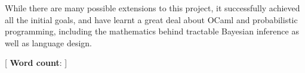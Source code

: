 While there are many possible extensions to this project, it successfully achieved all the initial goals, and have learnt a great deal about OCaml and probabilistic programming, including the mathematics behind tractable Bayesian inference as well as language design.

\mbox{}
\vfill
[ {\small \textbf{Word count}: }]